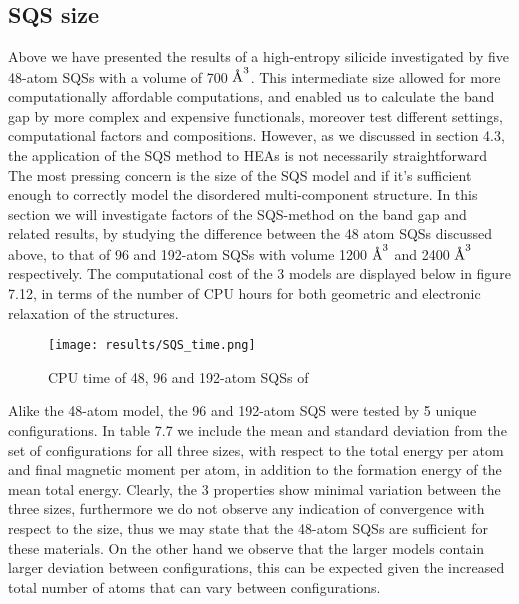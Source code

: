 \newpage
\subsection{SQS size}
Above we have presented the results of a high-entropy silicide  investigated by five 48-atom SQSs with a volume of 700 $\AA ^3$. This intermediate size allowed for more computationally affordable computations, and enabled us to calculate the band gap by more complex and expensive functionals, moreover test different settings, computational factors and compositions. However, as we discussed in section 4.3, the application of the SQS method to HEAs is not necessarily straightforward  The most pressing concern is the size of the SQS model and if it's sufficient enough to correctly model the disordered multi-component structure. In this section we will investigate factors of the SQS-method on the band gap and related results, by studying the difference between the 48 atom SQSs discussed above, to that of 96 and 192-atom SQSs with volume 1200 $\AA ^3$ and 2400 $\AA ^3$ respectively. The computational cost of the 3 models are displayed below in figure 7.12, in terms of the number of CPU hours for both geometric and electronic relaxation of the structures.

\begin{figure}[H]
\centering
\texttt{[image: results/SQS\_time.png]}
\caption{CPU time of 48, 96 and 192-atom SQSs of }
\end{figure}

Alike the 48-atom model, the 96 and 192-atom SQS were tested by 5 unique configurations. In table 7.7 we include the mean and standard deviation from the set of configurations for all three sizes, with respect to the total energy per atom and final magnetic moment per atom, in addition to the formation energy of the mean total energy. Clearly, the 3 properties show minimal variation between the three sizes, furthermore we do not observe any indication of convergence with respect to the size, thus we may state that the 48-atom SQSs are sufficient for these materials. On the other hand we observe that the larger models contain larger deviation between configurations, this can be expected given the increased total number of atoms that can vary between configurations. 

